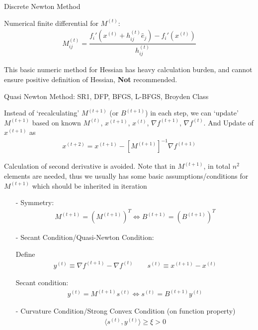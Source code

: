 \begin{point}
    Discrete Newton Method
\end{point}

    Numerical finite differential for $ M^{(t)} $:
    \begin{align}
        M^{(t)} _{ij}=\dfrac{f_i'\left(x^{(t)}+h_{ij}^{(t)}\hat{e}_j\right)-f_i'\left(x^{(t)}\right)}{h_{ij}^{(t)}}
    \end{align}
    
    This basic numeric method for Hessian has heavy calculation burden, and cannot ensure positive definition of Hessian,     
    \textbf{Not} recommended. 

\begin{point}
    Quasi Newton Method: SR1, DFP, BFGS, L-BFGS, Broyden Class
\end{point}

    Instead of `recalculating' $ M^{(t+1)} $ (or $ B^{(t+1)} $) in each step, we can `update' $ M^{(t+1)} $ based on known $ M^{(t)} $, $ x^{(t+1)} $, $ x^{(t)} $, $ \nabla f^{(t+1)} $, $ \nabla f^{(t)} $. And Update of $ x^{(t+1)} $ as
    \begin{align}
        x^{(t+2)}=x^{(t+1)}-\left[M^{(t+1)}\right]^{-1}\nabla f^{(t+1)} 
    \end{align}
 
    Calculation of second derivative is avoided. Note that in $ M^{(t+1)} $, in total $ n^2 $ elements are needed, thus we usually has some basic assumptions/conditions for $ M^{(t+1)} $ which should be inherited in iteration
\begin{itemize}[topsep=2pt,itemsep=0pt]
    \item[-] Symmetry:
    \begin{align}
        M^{(t+1)}=\left(M^{(t+1)}\right) ^T\Leftrightarrow B^{(t+1)}=\left(B^{(t+1)}\right)^T
    \end{align}
    \item[-] Secant Condition/Quasi-Newton Condition:
    
    Define
    \begin{align}
        y^{(t)}\equiv \nabla f^{(t+1)}-\nabla f^{(t)}\qquad s^{(t)}\equiv x^{(t+1)}-x^{(t)} 
    \end{align}
    
    Secant condition:
    \begin{align}
        y^{(t)}=M^{(t+1)}s^{(t)}\Leftrightarrow s^{(t)}=B^{(t+1)}y^{(t)} 
    \end{align}
    \item[-] Curvature Condition/Strong Convex Condition (on function property)
    \begin{align}
        \langle s^{(t)}, y^{(t)}\rangle\geq \xi >0 
    \end{align}
    
    
\end{itemize}

